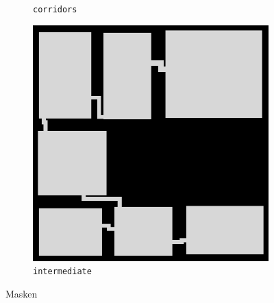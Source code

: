 \begin{figure}
\begin{subfigure}[b]{0.25\textwidth}
        \caption{\texttt{corridors}}
    \end{subfigure}\hspace{10bp}
    \begin{subfigure}[b]{0.25\textwidth}
        \centering        
        \includegraphics[width = \textwidth]{resources/img/wg/wgtmod_masks_intermediate.png}
        \caption{\texttt{intermediate}}
    \end{subfigure}\hfill
    \caption{Masken}
    \label{fig:wgmasks}
\end{figure}

